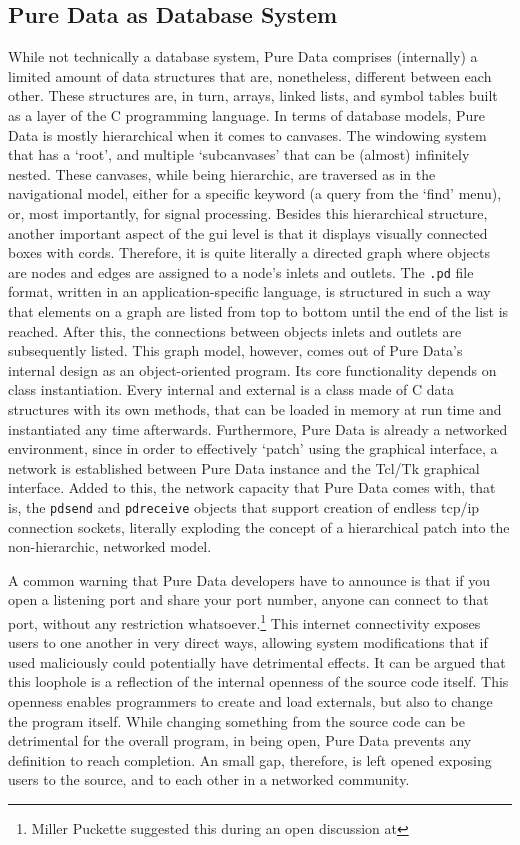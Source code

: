 \subsection{Pure Data as Database System}
\label{model:puredata}

While not technically a database system, Pure Data comprises (internally) a limited amount of data structures that are, nonetheless, different between each other. These structures are, in turn, arrays, linked lists, and symbol tables built as a layer of the C programming language. In terms of database models, Pure Data is mostly hierarchical when it comes to canvases. The windowing system that has a `root', and multiple `subcanvases' that can be (almost) infinitely nested. These canvases, while being hierarchic, are traversed as in the navigational model, either for a specific keyword (a query from the `find' menu), or, most importantly, for signal processing. Besides this hierarchical structure, another important aspect of the \gls{gui} level is that it displays visually connected boxes with cords. Therefore, it is quite literally a directed graph where objects are nodes and edges are assigned to a node's inlets and outlets. The \texttt{.pd} file format, written in an application-specific language, is structured in such a way that elements on a graph are listed from top to bottom until the end of the list is reached. After this, the connections between objects inlets and outlets are subsequently listed. This graph model, however, comes out of Pure Data's internal design as an object-oriented program. Its core functionality depends on class instantiation. Every internal and external is a class made of C data structures with its own methods, that can be loaded in memory at run time and instantiated any time afterwards. Furthermore, Pure Data is already a networked environment, since in order to effectively `patch' using the graphical interface, a network is established between Pure Data instance and the Tcl/Tk graphical interface. Added to this, the network capacity that Pure Data comes with, that is, the \texttt{pdsend} and \texttt{pdreceive} objects that support creation of endless \gls{tcp/ip} connection sockets, literally exploding the concept of a hierarchical patch into the non-hierarchic, networked model. 

A common warning that Pure Data developers have to announce is that if you open a listening port and share your port number, anyone can connect to that port, without any restriction whatsoever.\footnote{Miller Puckette suggested this during an open discussion at } This internet connectivity exposes users to one another in very direct ways, allowing system modifications that if used maliciously could potentially have detrimental effects. It can be argued that this loophole is a reflection of the internal openness of the source code itself. This openness enables programmers to create and load externals, but also to change the program itself. While changing something from the source code can be detrimental for the overall program, in being open, Pure Data prevents any definition to reach completion. An small gap, therefore, is left opened exposing users to the source, and to each other in a networked community.

